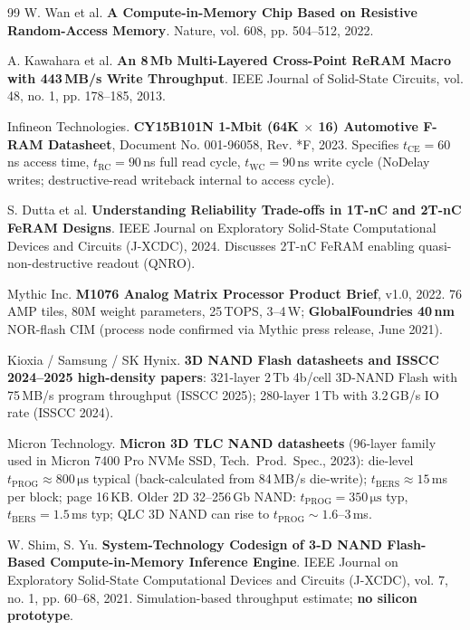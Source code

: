 \documentclass[11pt, a4paper]{ctexart}
\let\emph\textbf
\theoremstyle{definition}
\begin{document}
\begin{thebibliography}{99}
W. Wan et al.
\emph{A Compute-in-Memory Chip Based on Resistive Random-Access Memory}.
Nature, vol. 608, pp. 504--512, 2022.

A. Kawahara et al.
\emph{An 8\,Mb Multi-Layered Cross-Point ReRAM Macro with 443\,MB/s Write Throughput}.
IEEE Journal of Solid-State Circuits, vol. 48, no. 1, pp. 178--185, 2013.

Infineon Technologies.
\emph{CY15B101N 1-Mbit (64K $\times$ 16) Automotive F-RAM Datasheet}, Document No. 001-96058, Rev. *F, 2023. Specifies $t_{\mathrm{CE}} = 60$\,ns access time, $t_{\mathrm{RC}} = 90$\,ns full read cycle, $t_{\mathrm{WC}} = 90$\,ns write cycle (NoDelay\texttrademark{} writes; destructive-read writeback internal to access cycle).

S. Dutta et al.
\emph{Understanding Reliability Trade-offs in 1T-nC and 2T-nC FeRAM Designs}.
IEEE Journal on Exploratory Solid-State Computational Devices and Circuits (J-XCDC), 2024. Discusses 2T-nC FeRAM enabling quasi-non-destructive readout (QNRO).

Mythic Inc.
\emph{M1076 Analog Matrix Processor Product Brief}, v1.0, 2022.
76 AMP tiles, 80M weight parameters, 25\,TOPS, 3--4\,W; \emph{GlobalFoundries 40\,nm} NOR-flash CIM (process node confirmed via Mythic press release, June 2021).

Kioxia / Samsung / SK Hynix.
\emph{3D NAND Flash datasheets and ISSCC 2024--2025 high-density papers}: 321-layer 2\,Tb 4b/cell 3D-NAND Flash with 75\,MB/s program throughput (ISSCC 2025); 280-layer 1\,Tb with 3.2\,GB/s IO rate (ISSCC 2024).

Micron Technology.
\emph{Micron 3D TLC NAND datasheets} (96-layer family used in Micron 7400 Pro NVMe SSD, Tech.\ Prod.\ Spec., 2023): die-level $t_{\mathrm{PROG}} \approx 800\,\mathrm{\mu s}$ typical (back-calculated from 84\,MB/s die-write); $t_{\mathrm{BERS}} \approx 15$\,ms per block; page 16\,KB. Older 2D 32--256\,Gb NAND: $t_{\mathrm{PROG}} = 350\,\mathrm{\mu s}$ typ, $t_{\mathrm{BERS}} = 1.5$\,ms typ; QLC 3D NAND can rise to $t_{\mathrm{PROG}} \sim 1.6\text{--}3$\,ms.

W. Shim, S. Yu.
\emph{System-Technology Codesign of 3-D NAND Flash-Based Compute-in-Memory Inference Engine}.
IEEE Journal on Exploratory Solid-State Computational Devices and Circuits (J-XCDC), vol. 7, no. 1, pp. 60--68, 2021. Simulation-based throughput estimate; \textbf{no silicon prototype}.


\end{thebibliography}
\end{document}
